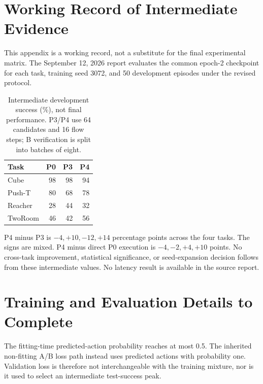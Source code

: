 \section{Working Record of Intermediate Evidence}
\label{app:intermediate}

This appendix is a working record, not a substitute for the final experimental matrix. The September 12, 2026 report evaluates the common epoch-2 checkpoint for each task, training seed 3072, and 50 development episodes under the revised protocol.

\begin{table}[h]
 \centering
 \begin{tabular}{lrrr}
  \toprule
  Task & P0 & P3 & P4 \\
  \midrule
  Cube & 98 & 98 & 94 \\
  Push-T & 80 & 68 & 78 \\
  Reacher & 28 & 44 & 32 \\
  TwoRoom & 46 & 42 & 56 \\
  \bottomrule
 \end{tabular}
 \caption{Intermediate development success (\%), not final performance. P3/P4 use 64 candidates and 16 flow steps; B verification is split into batches of eight.}
 \label{tab:epoch2}
\end{table}

P4 minus P3 is $-4,+10,-12,+14$ percentage points across the four tasks. The signs are mixed. P4 minus direct P0 execution is $-4,-2,+4,+10$ points. No cross-task improvement, statistical significance, or seed-expansion decision follows from these intermediate values. No latency result is available in the source report.

\section{Training and Evaluation Details to Complete}


The fitting-time predicted-action probability reaches at most 0.5. The inherited non-fitting A/B loss path instead uses predicted actions with probability one. Validation loss is therefore not interchangeable with the training mixture, nor is it used to select an intermediate test-success peak.

